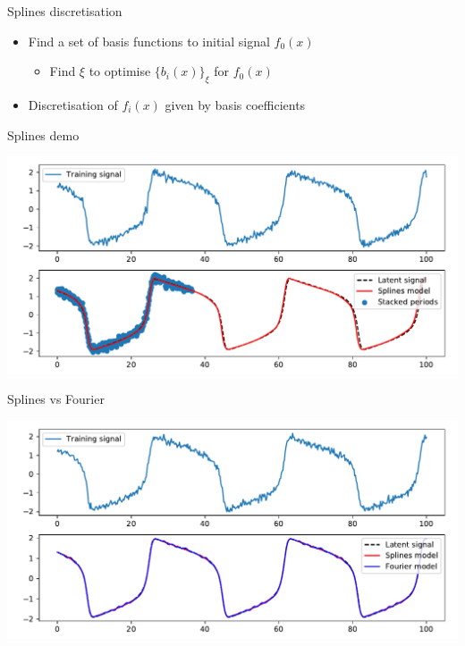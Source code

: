 \documentclass[presentation]{beamer}
\begin{document}
\begin{frame}[label={sec:org5f10a53}]{Splines discretisation}
\begin{itemize}
\item Find a set of basis functions to initial signal \(f_0(x)\)
\begin{itemize}
\item Find \(\xi\) to optimise \(\{b_i(x)\}_\xi\) for \(f_0(x)\)
\end{itemize}
\end{itemize}
\vfill
\begin{itemize}
\item Discretisation of \(f_i(x)\) given by basis coefficients
\end{itemize}
\end{frame}

\begin{frame}[label={sec:orgf487fb7}]{Splines demo}
\begin{center}
\includegraphics[width=.9\linewidth]{./spline_example.pdf}
\end{center}
\end{frame}

\begin{frame}[label={sec:org3e2c114}]{Splines vs Fourier}
\begin{center}
\includegraphics[width=.9\linewidth]{./discretisors.pdf}
\end{center}
\end{frame}
\end{document}
